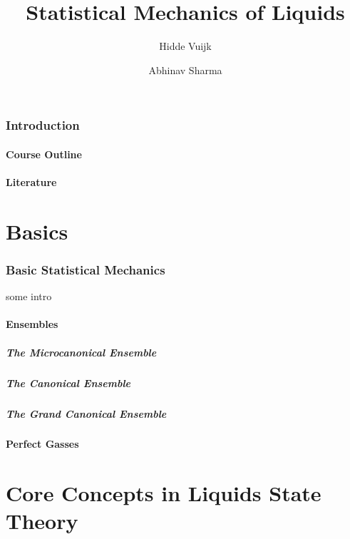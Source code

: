 \documentclass[a4paper,11pt]{article}
\title{Statistical Mechanics of Liquids}
\author[a]{Hidde Vuijk}
\author[a,b]{Abhinav Sharma}
\affiliation[a]{Leibniz-Institut f\"ur Polymerforschung, Dresden, Germany}
\affiliation[b]{TU Dresden}
\begin{document}
 

\maketitle
\flushbottom

\newpage
\section{Introduction}
\subsection{Course Outline}
\subsection{Literature}

\newpage
\part{Basics}

\section{Basic Statistical Mechanics}\label{sec:basic}

some intro

\subsection{Ensembles}\label{sec:enembles}
\subsubsection{The Microcanonical Ensemble}
\subsubsection{The Canonical Ensemble}
\subsubsection{The Grand Canonical Ensemble}
\subsection{Perfect Gasses}\label{sec:perfect}
\newpage


\part{Core Concepts in Liquids State Theory}
\end{document}
